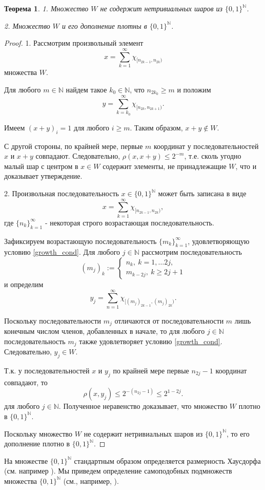 \documentclass[12pt]{article}
\newtheorem{thm}{Теорема}
\def\N{{\mathbb{N}}}
\begin{document}
\begin{thm}
1. Множество $W$ не содержит нетривиальных шаров из $\{0,1\}^\N$.

2. Множество $W$ и его дополнение плотны в $\{0,1\}^\N$.
\end{thm}

\begin{proof}
1. Рассмотрим произвольный элемент
$$x=\sum_{k=1}^\infty \chi_{[n_{2k-1},n_{2k})}$$
множества $W$.

Для любого $m\in \N$ найдем такое $k_0\in\N$, что $n_{2k_0}\ge m$ и положим
$$y=\sum_{k=k_0}^\infty \chi_{[n_{2k},n_{2k+1})}.$$

Имеем $(x+y)_i=1$ для любого $i\ge m$. Таким образом, $x+y\notin W$.

С другой стороны, по крайней мере, первые $m$ координат у последовательностей $x$ и $x+y$ совпадают. Следовательно, $\rho(x,x+y)\le2^{-m}$, т.е. сколь угодно малый шар с центром в $x\in W$ содержит элементы, не принадлежащие $W$, что и доказывает утверждение.

2. Произвольная последовательность $x\in\{0,1\}^\N$ может быть записана в виде
$$x=\sum_{k=1}^\infty \chi_{[n_{2k-1},n_{2k})},$$
где $\{n_k\}_{k=1}^\infty$ - некоторая строго возрастающая последовательность.

Зафиксируем возрастающую последовательность $\{m_k\}_{k=1}^\infty$, удовлетворяющую условию \eqref{growth_cond}. Для любого $j\in \N$ рассмотрим последовательность
$$(m_j)_k:=
\begin{cases}
n_k, \ k=1,\dots 2j,\\
m_{k-2j}, \ k\ge 2j+1
\end{cases}$$
и определим
$$y_j=\sum_{n=1}^\infty \chi_{[(m_j)_{2k-1},(m_j)_{2k})}.$$

Поскольку последовательности $m_j$ отличаются от последовательности $m$ лишь конечным числом членов, добавленных в начале, то для любого $j\in \N$ последовательность $m_j$ также удовлетворяет условию \eqref{growth_cond}. Следовательно, $y_j\in W$.

Т.к. у последовательностей $x$ и $y_j$ по крайней мере первые $n_{2j}-1$ координат совпадают, то
$$\rho(x,y_j)\le2^{-(n_{2j}-1)}\le2^{1-2j}.$$
для любого $j\in \N$. Полученное неравенство доказывает, что множество $W$ плотно в $\{0,1\}^\N$.


Поскольку множество $W$ не содержит нетривиальных шаров из $\{0,1\}^\N$, то его дополнение плотно в $\{0,1\}^\N$.
\end{proof}

На множестве $\{0,1\}^\N$ стандартным образом определяется размерность Хаусдорфа (см. например \cite[Секция 6]{Edgar}). Мы приведем определение самоподобных подмножеств множества $\{0,1\}^\N$ (см., например, \cite{falconer}).
\end{document}
